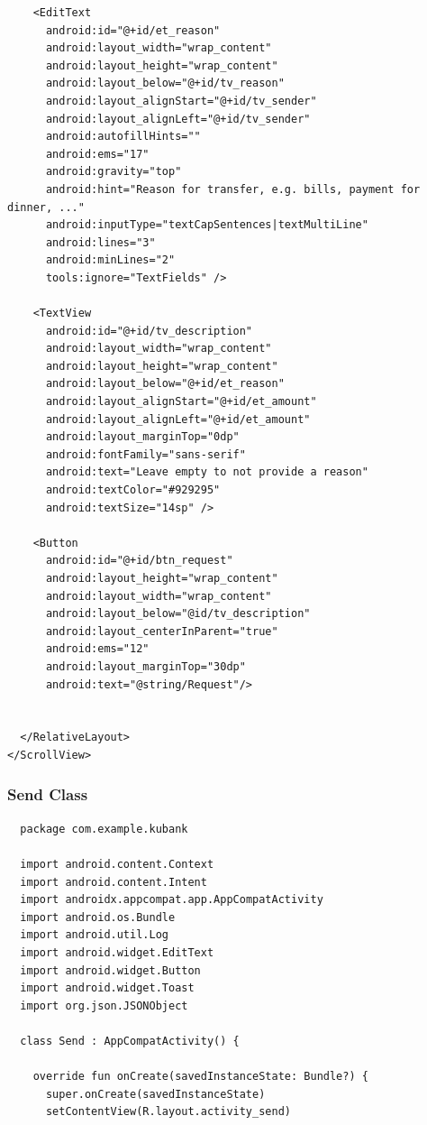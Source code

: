 \documentclass[11pt, a4paper]{article}
\begin{document}
\begin{appendices}
\begin{lstlisting}
    <EditText
      android:id="@+id/et_reason"
      android:layout_width="wrap_content"
      android:layout_height="wrap_content"
      android:layout_below="@+id/tv_reason"
      android:layout_alignStart="@+id/tv_sender"
      android:layout_alignLeft="@+id/tv_sender"
      android:autofillHints=""
      android:ems="17"
      android:gravity="top"
      android:hint="Reason for transfer, e.g. bills, payment for dinner, ..."
      android:inputType="textCapSentences|textMultiLine"
      android:lines="3"
      android:minLines="2"
      tools:ignore="TextFields" />

    <TextView
      android:id="@+id/tv_description"
      android:layout_width="wrap_content"
      android:layout_height="wrap_content"
      android:layout_below="@+id/et_reason"
      android:layout_alignStart="@+id/et_amount"
      android:layout_alignLeft="@+id/et_amount"
      android:layout_marginTop="0dp"
      android:fontFamily="sans-serif"
      android:text="Leave empty to not provide a reason"
      android:textColor="#929295"
      android:textSize="14sp" />

    <Button
      android:id="@+id/btn_request"
      android:layout_height="wrap_content"
      android:layout_width="wrap_content"
      android:layout_below="@id/tv_description"
      android:layout_centerInParent="true"
      android:ems="12"
      android:layout_marginTop="30dp"
      android:text="@string/Request"/>


  </RelativeLayout>
</ScrollView>
\end{lstlisting}
\subsubsection{Send Class}
\begin{lstlisting}
  package com.example.kubank
  
  import android.content.Context
  import android.content.Intent
  import androidx.appcompat.app.AppCompatActivity
  import android.os.Bundle
  import android.util.Log
  import android.widget.EditText
  import android.widget.Button
  import android.widget.Toast
  import org.json.JSONObject
  
  class Send : AppCompatActivity() {
  
    override fun onCreate(savedInstanceState: Bundle?) {
      super.onCreate(savedInstanceState)
      setContentView(R.layout.activity_send)
  

\end{lstlisting}
\end{appendices}
\end{document}
